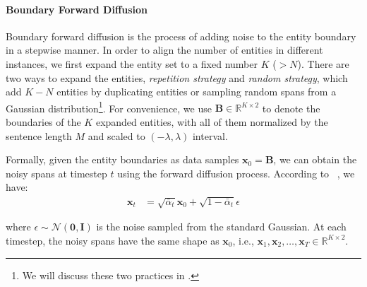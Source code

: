 \documentclass[11pt]{article}
\begin{document}
\paragraph{Boundary Forward Diffusion} 

Boundary forward diffusion is the process of adding noise to the entity boundary in a stepwise manner.
In order to align the number of entities in different instances, we first expand the entity set to a fixed number $K$ ($>N$).
There are two ways to expand the entities, \textit{repetition strategy} and \textit{random strategy}, which add $K-N$ entities by duplicating entities or sampling random spans from a Gaussian distribution\footnote{\;We will discuss these two practices in .}.
For convenience, we use $\mathbf{B}\in\mathbb{R}^{K\times 2}$ to denote the boundaries of the $K$ expanded entities, with all of them normalized by the sentence length $M$ and scaled to $(-\lambda, \lambda)$ interval.


 Formally, given the entity boundaries as data samples $\mathbf{x}_0=\mathbf{B}$, we can obtain the noisy spans at timestep $t$ using the forward diffusion process. According to ~, we have:
\begin{align}
\mathbf{x}_t & =\sqrt{\bar{\alpha}_t} \mathbf{x}_0+\sqrt{1-\bar{\alpha}_t } \epsilon
\end{align}

\noindent where $\epsilon \sim \mathcal{N}(\textbf{0}, \mathbf{I})$ is the noise sampled from the standard Gaussian. At each timestep, the noisy spans have the same shape as $\mathbf{x}_0$, i.e., $\mathbf{x}_1, \mathbf{x}_2, \ldots, \mathbf{x}_T  \in \mathbb{R}^{K\times 2}$.
\end{document}

